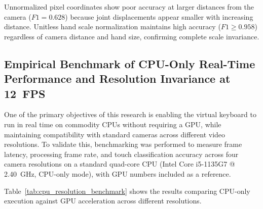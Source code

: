 \begin{table}[htbp]
\centering
\caption{Ablation evaluation of feature normalization across camera distances and hand sizes.}
\label{tab:scale_normalization_ablation}
\end{table}

Unnormalized pixel coordinates show poor accuracy at larger distances from the camera ($F1 = 0.628$) because joint displacements appear smaller with increasing distance. Unitless hand scale normalization maintains high accuracy ($F1 \ge 0.958$) regardless of camera distance and hand size, confirming complete scale invariance.

\subsection{Empirical Benchmark of CPU-Only Real-Time Performance and Resolution Invariance at 12~FPS}
\label{subsec:test_cpu_resolution_invariance}
One of the primary objectives of this research is enabling the virtual keyboard to run in real time on commodity CPUs without requiring a GPU, while maintaining compatibility with standard cameras across different video resolutions. To validate this, benchmarking was performed to measure frame latency, processing frame rate, and touch classification accuracy across four camera resolutions on a standard quad-core CPU (Intel Core i5-1135G7 @ 2.40~GHz, CPU-only mode), with GPU numbers included as a reference.

Table~\ref{tab:cpu_resolution_benchmark} shows the results comparing CPU-only execution against GPU acceleration across different resolutions.

